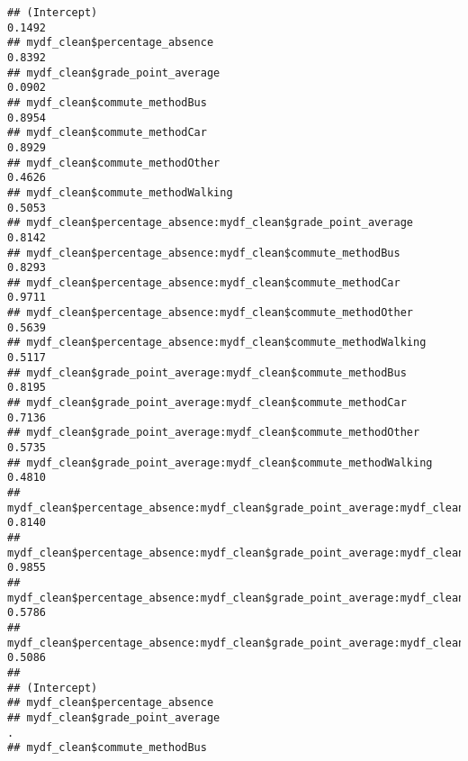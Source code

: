 \documentclass[
]{article}
\begin{document}
\begin{verbatim}
## (Intercept)                                                                                     0.1492
## mydf_clean$percentage_absence                                                                   0.8392
## mydf_clean$grade_point_average                                                                  0.0902
## mydf_clean$commute_methodBus                                                                    0.8954
## mydf_clean$commute_methodCar                                                                    0.8929
## mydf_clean$commute_methodOther                                                                  0.4626
## mydf_clean$commute_methodWalking                                                                0.5053
## mydf_clean$percentage_absence:mydf_clean$grade_point_average                                    0.8142
## mydf_clean$percentage_absence:mydf_clean$commute_methodBus                                      0.8293
## mydf_clean$percentage_absence:mydf_clean$commute_methodCar                                      0.9711
## mydf_clean$percentage_absence:mydf_clean$commute_methodOther                                    0.5639
## mydf_clean$percentage_absence:mydf_clean$commute_methodWalking                                  0.5117
## mydf_clean$grade_point_average:mydf_clean$commute_methodBus                                     0.8195
## mydf_clean$grade_point_average:mydf_clean$commute_methodCar                                     0.7136
## mydf_clean$grade_point_average:mydf_clean$commute_methodOther                                   0.5735
## mydf_clean$grade_point_average:mydf_clean$commute_methodWalking                                 0.4810
## mydf_clean$percentage_absence:mydf_clean$grade_point_average:mydf_clean$commute_methodBus       0.8140
## mydf_clean$percentage_absence:mydf_clean$grade_point_average:mydf_clean$commute_methodCar       0.9855
## mydf_clean$percentage_absence:mydf_clean$grade_point_average:mydf_clean$commute_methodOther     0.5786
## mydf_clean$percentage_absence:mydf_clean$grade_point_average:mydf_clean$commute_methodWalking   0.5086
##                                                                                                
## (Intercept)                                                                                    
## mydf_clean$percentage_absence                                                                  
## mydf_clean$grade_point_average                                                                .
## mydf_clean$commute_methodBus                                                                   

\end{verbatim}
\end{document}

